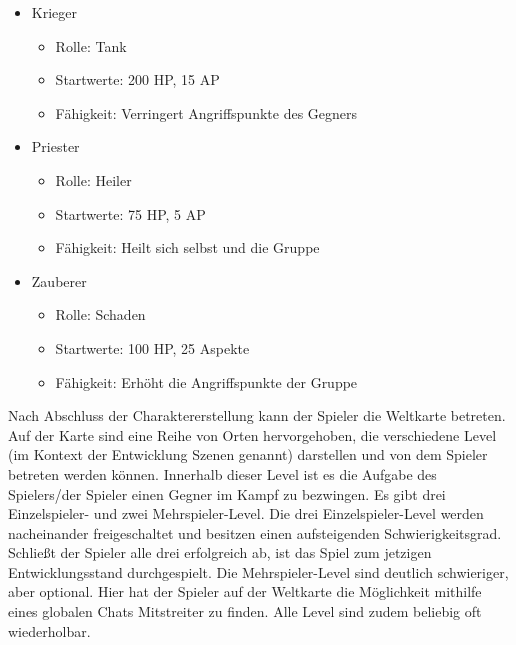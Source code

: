 \begin{itemize}
    \item Krieger
    \begin{itemize}
        \item Rolle:        Tank 
        \item Startwerte:   200 HP, 15 AP 
        \item Fähigkeit:    Verringert Angriffspunkte des Gegners
    \end{itemize}
    \item Priester
    \begin{itemize}
        \item Rolle:        Heiler
        \item Startwerte:   75 HP, 5 AP
        \item Fähigkeit:    Heilt sich selbst und die Gruppe
    \end{itemize}
    \item Zauberer
    \begin{itemize}
        \item Rolle:        Schaden
        \item Startwerte:   100 HP, 25 Aspekte
        \item Fähigkeit:    Erhöht die Angriffspunkte der Gruppe
    \end{itemize}
\end{itemize}

Nach Abschluss der Charaktererstellung kann der Spieler die Weltkarte betreten. Auf der Karte sind eine Reihe von Orten hervorgehoben, die verschiedene Level (im Kontext der Entwicklung Szenen genannt) darstellen und von dem Spieler betreten werden können. Innerhalb dieser Level ist es die Aufgabe des Spielers/der Spieler einen Gegner im Kampf zu bezwingen. Es gibt drei Einzelspieler- und zwei Mehrspieler-Level. Die drei Einzelspieler-Level werden nacheinander freigeschaltet und besitzen einen aufsteigenden Schwierigkeitsgrad. Schließt der Spieler alle drei erfolgreich ab, ist das Spiel zum jetzigen Entwicklungsstand durchgespielt. Die Mehrspieler-Level sind deutlich schwieriger, aber optional. Hier hat der Spieler auf der Weltkarte die Möglichkeit mithilfe eines globalen Chats Mitstreiter zu finden. Alle Level sind zudem beliebig oft wiederholbar.

